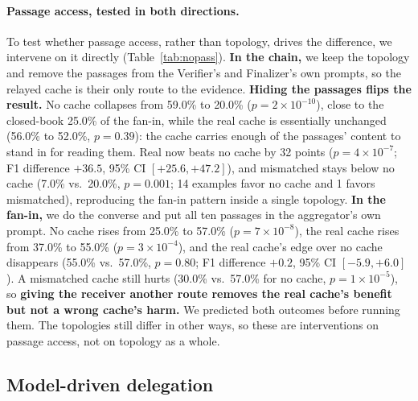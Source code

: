 \documentclass[11pt]{article}
\begin{document}
\paragraph{Passage access, tested in both directions.} To test whether passage
access, rather than topology, drives the difference, we intervene on it directly
(Table~\ref{tab:nopass}). \textbf{In the chain,} we keep the topology and remove the
passages from the Verifier's and Finalizer's own prompts, so the relayed cache is
their only route to the evidence.
\textbf{Hiding the passages flips the result.} No cache collapses from 59.0\% to
20.0\% ($p=2\times10^{-10}$), close to the closed-book 25.0\% of the fan-in, while
the real cache is essentially unchanged (56.0\% to 52.0\%, $p=0.39$): the cache
carries enough of the passages' content to stand in for reading them. Real now
beats no cache by 32 points ($p=4\times10^{-7}$; F1 difference $+36.5$, 95\% CI
$[+25.6,+47.2]$), and mismatched stays below no cache (7.0\% vs.\ 20.0\%,
$p=0.001$; 14 examples favor no cache and 1 favors mismatched), reproducing the
fan-in pattern inside a single topology. \textbf{In the fan-in,} we do the
converse and put all ten passages in the aggregator's own prompt. No cache
rises from 25.0\% to 57.0\% ($p=7\times10^{-8}$), the real cache rises from 37.0\%
to 55.0\% ($p=3\times10^{-4}$), and the real cache's edge over no cache
disappears (55.0\% vs.\ 57.0\%, $p=0.80$; F1 difference $+0.2$, 95\% CI
$[-5.9,+6.0]$). A mismatched cache still hurts (30.0\% vs.\ 57.0\% for no cache,
$p=1\times10^{-5}$), so \textbf{giving the receiver another route removes the
real cache's benefit but not a wrong cache's harm.} We predicted both outcomes
before running them. The topologies still differ in other ways, so these are
interventions on passage access, not on topology as a whole.

\subsection{Model-driven delegation}
\end{document}
